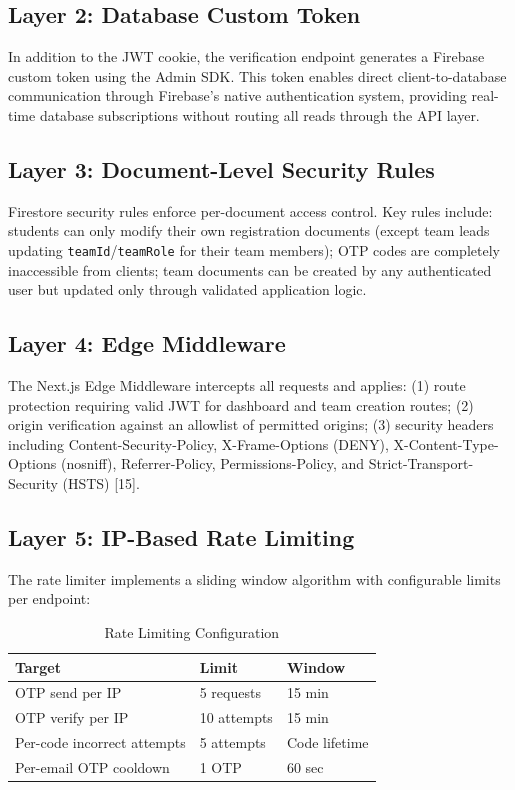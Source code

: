 \documentclass[12pt,a4paper]{article}
\begin{document}
\subsection{Layer 2: Database Custom Token}

In addition to the JWT cookie, the verification endpoint generates a Firebase custom token using the Admin SDK. This token enables direct client-to-database communication through Firebase's native authentication system, providing real-time database subscriptions without routing all reads through the API layer.

\subsection{Layer 3: Document-Level Security Rules}

Firestore security rules enforce per-document access control. Key rules include: students can only modify their own registration documents (except team leads updating \texttt{teamId}/\texttt{teamRole} for their team members); OTP codes are completely inaccessible from clients; team documents can be created by any authenticated user but updated only through validated application logic.

\subsection{Layer 4: Edge Middleware}

The Next.js Edge Middleware intercepts all requests and applies: (1) route protection requiring valid JWT for dashboard and team creation routes; (2) origin verification against an allowlist of permitted origins; (3) security headers including Content-Security-Policy, X-Frame-Options (DENY), X-Content-Type-Options (nosniff), Referrer-Policy, Permissions-Policy, and Strict-Transport-Security (HSTS) [15].

\subsection{Layer 5: IP-Based Rate Limiting}

The rate limiter implements a sliding window algorithm with configurable limits per endpoint:

\begin{table}[H]
\centering
\caption{Rate Limiting Configuration}
\begin{tabular}{@{}lll@{}}
\toprule
\textbf{Target} & \textbf{Limit} & \textbf{Window} \\
\midrule
OTP send per IP & 5 requests & 15 min \\
OTP verify per IP & 10 attempts & 15 min \\
Per-code incorrect attempts & 5 attempts & Code lifetime \\
Per-email OTP cooldown & 1 OTP & 60 sec \\
\bottomrule
\end{tabular}
\end{table}
\end{document}
